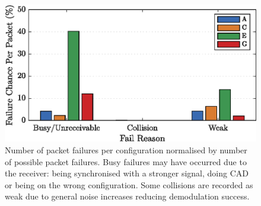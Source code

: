 \vspace{-10mm}
\begin{figure}[H]
    \centering
   	\includegraphics{Figures/sim_failure_reasons}
    \caption[Failure probabilities for protocol data packets]{
    Number of packet failures per configuration normalised by number of possible packet failures. Busy failures may have occurred due to the receiver: being synchronised with a stronger signal, doing CAD or being on the wrong configuration. Some collisions are recorded as weak due to general noise increases reducing demodulation success.
    \label{fig:sim_failure_reasons}
    }	
\end{figure}
